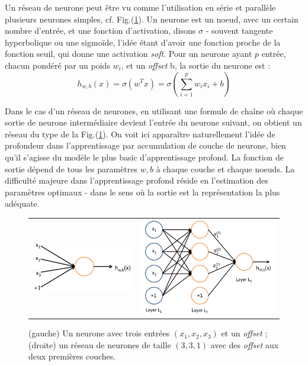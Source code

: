 \documentclass[10pt,a4paper]{article}
\begin{document}
Un réseau de neurone peut être vu comme l'utilisation en série et parallèle plusieurs neurones simples, cf. Fig.(\ref{fig1}). Un neurone est un noeud, avec un certain nombre d'entrée, et une fonction d'activation, disons $\sigma$ - souvent tangente hyperbolique ou une sigmoïde, l'idée étant d'avoir une fonction proche de la fonction seuil, qui donne une activation \emph{soft}. Pour un neurone ayant $p$ entrée, chacun pondéré par un poids $w_i$, et un \emph{offset} b, la sortie du neurone est :
\begin{equation}
h_{w,b}(x)=\sigma(w^Tx)=\sigma\left(\sum_{i=1}^p w_i x_i + b\right)
\end{equation}

Dans le cas d'un réseau de neurones, en utilisant une formule de chaîne où chaque sortie de neurone intermédiaire devient l'entrée du neurone suivant, on obtient un réseau du type de la Fig.(\ref{fig1}). On voit ici apparaître naturellement l'idée de profondeur dans l'apprentissage par accumulation de couche de neurone, bien qu'il s'agisse du modèle le plus basic d'apprentissage profond. La fonction de sortie dépend de tous les paramètres $w,b$ à chaque couche et chaque noeuds. La difficulté majeure dans l'apprentissage profond réside en l'estimation des paramètres optimaux - dans le sens où la sortie est la représentation la plus adéquate.

\begin{figure}[ht!]
\centering
\begin{tabular}{cc}
\includegraphics[width = .5\columnwidth]{fig/SingleNeuron.png} &
\includegraphics[width = .5\columnwidth]{fig/Network331.png} 
\end{tabular}
\caption{(gauche) Un neurone avec trois entrées $(x_1,x_2,x_3)$ et un \emph{offset} ; (droite) un réseau de neurones de taille $(3,3,1)$ avec des \emph{offset} aux deux premières couches.}
\label{fig1}
\end{figure}
\end{document}
